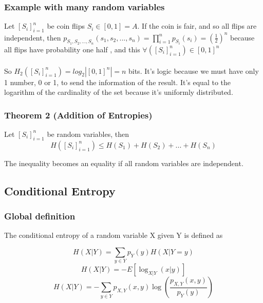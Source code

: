 \documentclass{article}
\begin{document}
\subsubsection{Example with many random variables}
Let $ [S_i]_{i=1}^{n} $ be coin flips $ S_i \in [0, 1] = A $. If the coin is fair, and so all flips are independent, then $ p_{S_1,S_2,...,S_n}(s_1, s_2, ..., s_n) = \prod_{i=1}^{n}p_{S_i}(s_i) = (\frac{1}{2})^n $ because all flips have probability one half , and this $ \forall ([S_i]_{i=1}^{n}) \in [0, 1]^n $
\\
\\
So $ H_2([S_i]_{i=1}^{n}) = log_2| [0, 1]^n | = n $ bits. It's logic because we must have only 1 number, 0 or 1, to send the information of the result. It's equal to the logarithm of the cardinality of the set because it's uniformly distributed.

\subsubsection{Theorem 2 (Addition of Entropies)} Let $ [S_i]_{i=1}^{n} $ be random variables, then
\begin{equation}
H([S_i]_{i=1}^{n}) \leq H(S_1) + H(S_2) + ... + H(S_n)
\end{equation}
\begin{tcolorbox}[width=12.1cm, leftrule=3mm]
The inequality becomes an equality if all random variables are independent.
\end{tcolorbox}

\subsection{Conditional Entropy}
\subsubsection{Global definition} The conditional entropy of a random variable X given Y is defined as
\begin{tcolorbox}[sharp corners, colback=green!30, colframe=green!80!blue, title=Conditional Entropy]
\begin{equation}
H(X|Y) = \sum_{y \in Y}p_{Y}(y)H(X|Y = y)
\end{equation}
\begin{equation}
H(X|Y) = -E[\log_{X|Y}(x|y)]
\end{equation}
\begin{equation}
H(X|Y) = - \sum_{y \in Y}p_{X,Y}(x,y)\log(\frac{p_{X,Y}(x,y)}{p_{Y}(y)})
\end{equation}
\end{tcolorbox}
\end{document}
